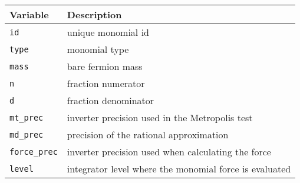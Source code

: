 \documentclass[12pt]{article}
\begin{document}
\vspace{2mm}

\begin{center}
\begin{tabular}{l|l}
 Variable & Description \\
 \hline
 \verb|id|         & unique monomial id \\
 \verb|type|       & monomial type \\
 \verb|mass|       & bare fermion mass \\
 \verb|n|          & fraction numerator \\
 \verb|d|          & fraction denominator \\
 \verb|mt_prec|    & inverter precision used in the Metropolis test \\
 \verb|md_prec|    & precision of the rational approximation \\
 \verb|force_prec| & inverter precision used when calculating the force \\
 \verb|level|      & integrator level where the monomial force is evaluated
\end{tabular}
\end{center}
\end{document}
